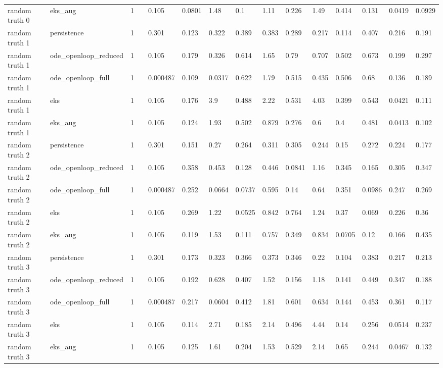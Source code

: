 \begin{table}[t]
\begin{tabular}{lllllllllllllll}
random truth 0 & eks\_aug & 1 &  & 0.105 & 0.0801 & 1.48 & 0.1 & 1.11 & 0.226 & 1.49 & 0.414 & 0.131 & 0.0419 & 0.0929 \\
random truth 1 & persistence & 1 &  & 0.301 & 0.123 & 0.322 & 0.389 & 0.383 & 0.289 & 0.217 & 0.114 & 0.407 & 0.216 & 0.191 \\
random truth 1 & ode\_openloop\_reduced & 1 &  & 0.105 & 0.179 & 0.326 & 0.614 & 1.65 & 0.79 & 0.707 & 0.502 & 0.673 & 0.199 & 0.297 \\
random truth 1 & ode\_openloop\_full & 1 &  & 0.000487 & 0.109 & 0.0317 & 0.622 & 1.79 & 0.515 & 0.435 & 0.506 & 0.68 & 0.136 & 0.189 \\
random truth 1 & eks & 1 &  & 0.105 & 0.176 & 3.9 & 0.488 & 2.22 & 0.531 & 4.03 & 0.399 & 0.543 & 0.0421 & 0.111 \\
random truth 1 & eks\_aug & 1 &  & 0.105 & 0.124 & 1.93 & 0.502 & 0.879 & 0.276 & 0.6 & 0.4 & 0.481 & 0.0413 & 0.102 \\
random truth 2 & persistence & 1 &  & 0.301 & 0.151 & 0.27 & 0.264 & 0.311 & 0.305 & 0.244 & 0.15 & 0.272 & 0.224 & 0.177 \\
random truth 2 & ode\_openloop\_reduced & 1 &  & 0.105 & 0.358 & 0.453 & 0.128 & 0.446 & 0.0841 & 1.16 & 0.345 & 0.165 & 0.305 & 0.347 \\
random truth 2 & ode\_openloop\_full & 1 &  & 0.000487 & 0.252 & 0.0664 & 0.0737 & 0.595 & 0.14 & 0.64 & 0.351 & 0.0986 & 0.247 & 0.269 \\
random truth 2 & eks & 1 &  & 0.105 & 0.269 & 1.22 & 0.0525 & 0.842 & 0.764 & 1.24 & 0.37 & 0.069 & 0.226 & 0.36 \\
random truth 2 & eks\_aug & 1 &  & 0.105 & 0.119 & 1.53 & 0.111 & 0.757 & 0.349 & 0.834 & 0.0705 & 0.12 & 0.166 & 0.435 \\
random truth 3 & persistence & 1 &  & 0.301 & 0.173 & 0.323 & 0.366 & 0.373 & 0.346 & 0.22 & 0.104 & 0.383 & 0.217 & 0.213 \\
random truth 3 & ode\_openloop\_reduced & 1 &  & 0.105 & 0.192 & 0.628 & 0.407 & 1.52 & 0.156 & 1.18 & 0.141 & 0.449 & 0.347 & 0.188 \\
random truth 3 & ode\_openloop\_full & 1 &  & 0.000487 & 0.217 & 0.0604 & 0.412 & 1.81 & 0.601 & 0.634 & 0.144 & 0.453 & 0.361 & 0.117 \\
random truth 3 & eks & 1 &  & 0.105 & 0.114 & 2.71 & 0.185 & 2.14 & 0.496 & 4.44 & 0.14 & 0.256 & 0.0514 & 0.237 \\
random truth 3 & eks\_aug & 1 &  & 0.105 & 0.125 & 1.61 & 0.204 & 1.53 & 0.529 & 2.14 & 0.65 & 0.244 & 0.0467 & 0.132 \\

\end{tabular}
\end{table}
